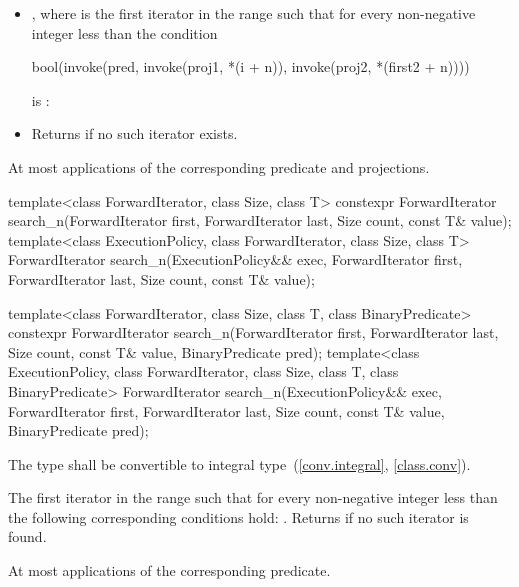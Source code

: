 \begin{itemdescr}
\pnum
\returns
\begin{itemize}
\item
  ,
  where  is
  the first iterator in the range 
  such that
  for every non-negative integer  less than 
  the condition
\begin{codeblock}
bool(invoke(pred, invoke(proj1, *(i + n)), invoke(proj2, *(first2 + n))))
\end{codeblock}
  is :
\item
  Returns  if no such iterator exists.
\end{itemize}

\pnum
\complexity
At most  applications
of the corresponding predicate and projections.
\end{itemdescr}

%
\begin{itemdecl}
template<class ForwardIterator, class Size, class T>
  constexpr ForwardIterator
    search_n(ForwardIterator first, ForwardIterator last,
             Size count, const T& value);
template<class ExecutionPolicy, class ForwardIterator, class Size, class T>
  ForwardIterator
    search_n(ExecutionPolicy&& exec,
             ForwardIterator first, ForwardIterator last,
             Size count, const T& value);

template<class ForwardIterator, class Size, class T,
         class BinaryPredicate>
  constexpr ForwardIterator
    search_n(ForwardIterator first, ForwardIterator last,
             Size count, const T& value,
             BinaryPredicate pred);
template<class ExecutionPolicy, class ForwardIterator, class Size, class T,
         class BinaryPredicate>
  ForwardIterator
    search_n(ExecutionPolicy&& exec,
             ForwardIterator first, ForwardIterator last,
             Size count, const T& value,
             BinaryPredicate pred);
\end{itemdecl}

\begin{itemdescr}
\pnum
\requires
The type 
shall be convertible to integral type~(\ref{conv.integral}, \ref{class.conv}).

\pnum
\returns
The first iterator  in the range 
such that for every non-negative integer  less than 
the following corresponding conditions hold:
.
Returns  if no such iterator is found.

\pnum
\complexity
At most  applications of the corresponding predicate.
\end{itemdescr}


